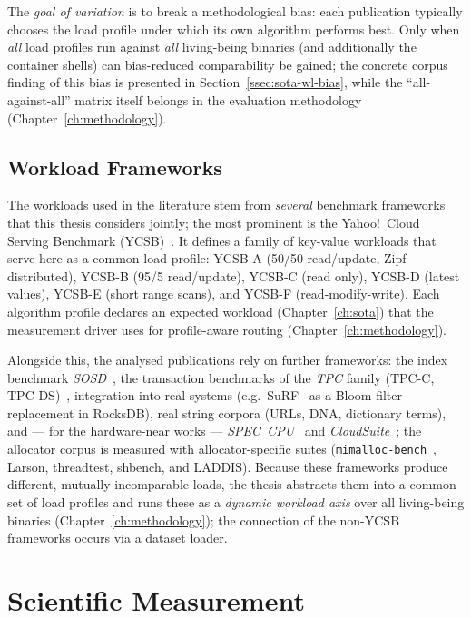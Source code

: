 The \emph{goal of variation} is to break a methodological bias: each publication typically chooses
the load profile under which its own algorithm performs best. Only when \emph{all} load profiles run
against \emph{all} living-being binaries (and additionally the container shells) can bias-reduced
comparability be gained; the concrete corpus finding of this bias is presented in
Section~\ref{ssec:sota-wl-bias}, while the ``all-against-all'' matrix itself belongs in the
evaluation methodology (Chapter~\ref{ch:methodology}).

\subsection{Workload Frameworks}\label{sec:ycsb}
The workloads used in the literature stem from \emph{several} benchmark frameworks that this thesis
considers jointly; the most prominent is the Yahoo!\ Cloud Serving Benchmark
(YCSB)~\cite{cooper2010ycsb}. It defines a family of key-value workloads that serve here as a common
load profile: YCSB-A (50/50 read/update, Zipf-distributed), YCSB-B (95/5 read/update), YCSB-C (read
only), YCSB-D (latest values), YCSB-E (short range scans), and YCSB-F (read-modify-write). Each
algorithm profile declares an expected workload (Chapter~\ref{ch:sota}) that the measurement driver
uses for profile-aware routing (Chapter~\ref{ch:methodology}).

Alongside this, the analysed publications rely on further frameworks: the index benchmark
\emph{SOSD}~\cite{kipf2019sosd}, the transaction benchmarks of the \emph{TPC} family (TPC-C,
TPC-DS)~\cite{tpc_benchmarks}, integration into real systems (e.g.\ SuRF~\cite{zhang2018surf} as a
Bloom-filter replacement in RocksDB), real string corpora (URLs, DNA, dictionary terms), and --- for
the hardware-near works --- \emph{SPEC~CPU}~\cite{spec_cpu2017} and
\emph{CloudSuite}~\cite{ferdman2012cloudsuite}; the allocator corpus is measured with
allocator-specific suites (\texttt{mimalloc-bench}~\cite{mimalloc_bench}, Larson, threadtest,
shbench, and LADDIS). Because these frameworks produce different, mutually incomparable loads, the
thesis abstracts them into a common set of load profiles and runs these as a
\emph{dynamic workload axis} over all living-being binaries (Chapter~\ref{ch:methodology}); the
connection of the non-YCSB frameworks occurs via a dataset loader.

\section{Scientific Measurement}\label{sec:measurement-basics}

